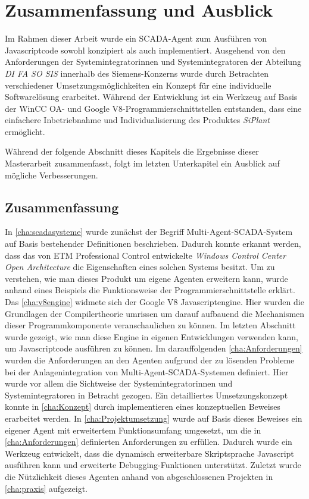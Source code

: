 \chapter{Zusammenfassung und Ausblick}
\label{cha:Zusammenfassung}

Im Rahmen dieser Arbeit wurde ein SCADA-Agent zum Ausführen von Javascriptcode sowohl konzipiert als auch implementiert. 
Ausgehend von den Anforderungen der Systemintegratorinnen und Systemintegratoren der Abteilung \textit{DI FA SO SIS} innerhalb des Siemens-Konzerns 
wurde durch Betrachten verschiedener Umsetzungsmöglichkeiten ein Konzept für eine individuelle Softwarelösung erarbeitet. 
Während der Entwicklung ist ein Werkzeug auf Basis der WinCC OA- und Google V8-Programmierschnittstellen entstanden, 
dass eine einfachere Inbetriebnahme und Individualisierung des Produktes \textit{SiPlant} ermöglicht.
\newline
\par
Während der folgende Abschnitt dieses Kapitels die Ergebnisse dieser Masterarbeit zusammenfasst, folgt im letzten Unterkapitel ein Ausblick auf
mögliche Verbesserungen.

\section{Zusammenfassung}


In \autoref{cha:scadasysteme} wurde zunächst der Begriff Multi-Agent-SCADA-System auf Basis bestehender Definitionen beschrieben.
Dadurch konnte erkannt werden, dass das von ETM Professional Control entwickelte \textit{Windows Control Center Open Architecture} 
die Eigenschaften eines solchen Systems besitzt. Um zu verstehen, wie man dieses Produkt um eigene Agenten erweitern kann, wurde anhand eines 
Beispiels die Funktionsweise der Programmierschnittstelle erklärt. Das \autoref{cha:v8engine} widmete sich der Google V8 Javascriptengine. 
Hier wurden die Grundlagen der Compilertheorie umrissen um darauf aufbauend die Mechanismen dieser Programmkomponente veranschaulichen zu können. Im letzten Abschnitt wurde gezeigt,
wie man diese Engine in eigenen Entwicklungen verwenden kann, um Javascriptcode ausführen zu können.
Im darauffolgenden \autoref{cha:Anforderungen} wurden die Anforderungen an den Agenten aufgrund der zu lösenden Probleme bei der
Anlagenintegration von Multi-Agent-SCADA-Systemen definiert. Hier wurde vor allem die Sichtweise der Systemintegratorinnen und 
Systemintegratoren in Betracht gezogen. Ein detailliertes Umsetzungskonzept konnte in \autoref{cha:Konzept} durch implementieren eines konzeptuellen Beweises erarbeitet werden.
In \autoref{cha:Projektumsetzung} wurde auf Basis dieses Beweises ein eigener Agent mit erweitertem Funktionsumfang umgesetzt,
um die in \autoref{cha:Anforderungen} definierten Anforderungen zu erfüllen. Dadurch wurde ein Werkzeug entwickelt, dass die 
dynamisch erweiterbare Skriptsprache Javascript ausführen kann und erweiterte Debugging-Funktionen unterstützt. 
Zuletzt wurde die Nützlichkeit dieses Agenten anhand von abgeschlossenen Projekten in \autoref{cha:praxis} aufgezeigt.

